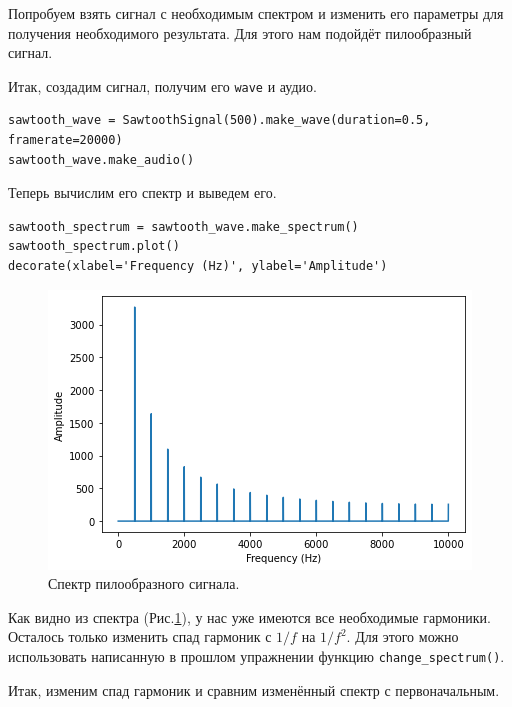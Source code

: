 \documentclass[a4paper, 14pt]{extarticle}
\begin{document}
    Попробуем взять сигнал с необходимым спектром и изменить его параметры для получения необходимого результата.
    Для этого нам подойдёт пилообразный сигнал.

    Итак, создадим сигнал, получим его \texttt{wave} и аудио.

    \begin{lstlisting}[caption= Создание пилообразного сигнала и получение его \texttt{wave}., label={lst:task6_create_wave}]
sawtooth_wave = SawtoothSignal(500).make_wave(duration=0.5, framerate=20000)
sawtooth_wave.make_audio()
    \end{lstlisting}

    Теперь вычислим его спектр и выведем его.

    \begin{lstlisting}[caption= Вычисленине и вывод спектра., label={lst:task6_sawtooth_spectrum}]
sawtooth_spectrum = sawtooth_wave.make_spectrum()
sawtooth_spectrum.plot()
decorate(xlabel='Frequency (Hz)', ylabel='Amplitude')
    \end{lstlisting}

    \begin{figure}[h]
        \centering
        \includegraphics[width=0.8\linewidth]{resources/Images/task6_sawtooth_spectrum}
        \caption{Спектр пилообразного сигнала.}
        \label{fig:task6_sawtooth_spectrum}
    \end{figure}

    Как видно из спектра (Рис.\ref{fig:task6_sawtooth_spectrum}), у нас уже имеются все необходимые гармоники.
    Осталось только изменить спад гармоник с $1/f$ на $1/f^2$. Для этого можно использовать написанную в прошлом
    упражнении функцию \texttt{change\_spectrum()}.

    Итак, изменим спад гармоник и сравним изменённый спектр с первоначальным.
\end{document}
